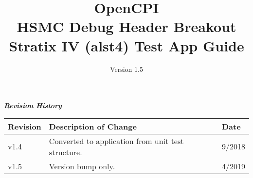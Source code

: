 \iffalse
This file is protected by Copyright. Please refer to the COPYRIGHT file
distributed with this source distribution.

This file is part of OpenCPI <http://www.opencpi.org>

OpenCPI is free software: you can redistribute it and/or modify it under the
terms of the GNU Lesser General Public License as published by the Free Software
Foundation, either version 3 of the License, or (at your option) any later
version.

OpenCPI is distributed in the hope that it will be useful, but WITHOUT ANY
WARRANTY; without even the implied warranty of MERCHANTABILITY or FITNESS FOR A
PARTICULAR PURPOSE. See the GNU Lesser General Public License for more details.

You should have received a copy of the GNU Lesser General Public License along
with this program. If not, see <http://www.gnu.org/licenses/>.
\fi

\def\docTitle{OpenCPI\\ HSMC Debug Header Breakout Stratix IV (alst4) Test App Guide}
\def\docVersion{1.5}
\def\snippetpath{../../../../../doc/av/tex/snippets}


\date{Version \docVersion} %
\title{\docTitle}
\usepackage{graphicx}
\graphicspath{ {figures/} }
\usepackage{textcomp}
\usepackage{listings}


\maketitle

\begin{center}
  \textit{\textbf{Revision History}}
  \begin{longtable}{|p{}
                    |p{}
                    |p{}|}
    \hline
    \rowcolor{blue}
    \textbf{Revision} & \textbf{Description of Change} & \textbf{Date} \\
    \hline
    v1.4 & Converted to application from unit test structure. & 9/2018 \\
    \hline
    v1.5 & Version bump only. & 4/2019 \\
    \hline
  \end{longtable}
\end{center}

